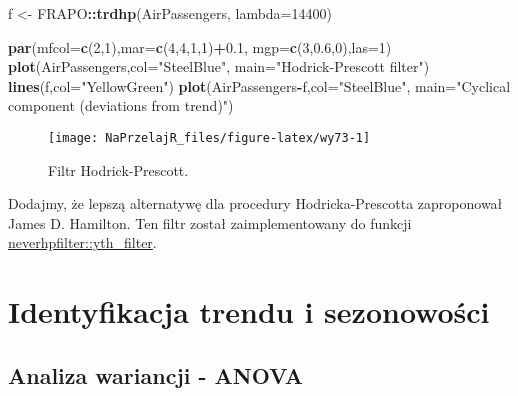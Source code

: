 \documentclass[polish,]{book}
\newenvironment{Shaded}{\begin{snugshade}}{\end{snugshade}}
\newcommand{\DataTypeTok}[1]{\textcolor[rgb]{0.13,0.29,0.53}{#1}}
\newcommand{\DecValTok}[1]{\textcolor[rgb]{0.00,0.00,0.81}{#1}}
\newcommand{\FloatTok}[1]{\textcolor[rgb]{0.00,0.00,0.81}{#1}}
\newcommand{\KeywordTok}[1]{\textcolor[rgb]{0.13,0.29,0.53}{\textbf{#1}}}
\newcommand{\NormalTok}[1]{#1}
\newcommand{\OperatorTok}[1]{\textcolor[rgb]{0.81,0.36,0.00}{\textbf{#1}}}
\newcommand{\StringTok}[1]{\textcolor[rgb]{0.31,0.60,0.02}{#1}}
\begin{document}
\begin{Shaded}
\begin{Highlighting}[]
\NormalTok{f <-}\StringTok{ }\NormalTok{FRAPO}\OperatorTok{::}\KeywordTok{trdhp}\NormalTok{(AirPassengers, }\DataTypeTok{lambda=}\DecValTok{14400}\NormalTok{)}

\KeywordTok{par}\NormalTok{(}\DataTypeTok{mfcol=}\KeywordTok{c}\NormalTok{(}\DecValTok{2}\NormalTok{,}\DecValTok{1}\NormalTok{),}\DataTypeTok{mar=}\KeywordTok{c}\NormalTok{(}\DecValTok{4}\NormalTok{,}\DecValTok{4}\NormalTok{,}\DecValTok{1}\NormalTok{,}\DecValTok{1}\NormalTok{)}\OperatorTok{+}\FloatTok{0.1}\NormalTok{, }\DataTypeTok{mgp=}\KeywordTok{c}\NormalTok{(}\DecValTok{3}\NormalTok{,}\FloatTok{0.6}\NormalTok{,}\DecValTok{0}\NormalTok{),}\DataTypeTok{las=}\DecValTok{1}\NormalTok{)}
\KeywordTok{plot}\NormalTok{(AirPassengers,}\DataTypeTok{col=}\StringTok{"SteelBlue"}\NormalTok{,}
     \DataTypeTok{main=}\StringTok{"Hodrick-Prescott filter"}\NormalTok{)}
\KeywordTok{lines}\NormalTok{(f,}\DataTypeTok{col=}\StringTok{"YellowGreen"}\NormalTok{)}
\KeywordTok{plot}\NormalTok{(AirPassengers}\OperatorTok{-}\NormalTok{f,}\DataTypeTok{col=}\StringTok{"SteelBlue"}\NormalTok{,}
     \DataTypeTok{main=}\StringTok{"Cyclical component (deviations from trend)"}\NormalTok{)}
\end{Highlighting}
\end{Shaded}

\begin{figure}[h]

{\centering \texttt{[image: NaPrzelajR\_files/figure-latex/wy73-1]} 

}

\caption{Filtr Hodrick-Prescott.}\label{fig:wy73}
\end{figure}

Dodajmy, że lepszą alternatywę dla procedury Hodricka-Prescotta zaproponował James D. Hamilton. Ten filtr został zaimplementowany do funkcji \href{https://rdrr.io/cran/neverhpfilter/man/yth_filter.html}{neverhpfilter::yth\_filter}.

\hypertarget{part_72}{%
\section{Identyfikacja trendu i sezonowości}\label{part_72}}

\hypertarget{part_721}{%
\subsection{Analiza wariancji - ANOVA}\label{part_721}}
\end{document}
